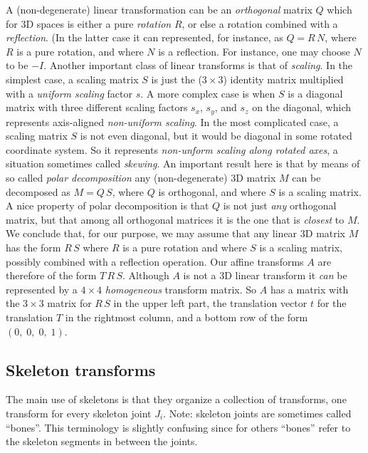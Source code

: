 \noindent
A (non-degenerate) linear transformation can be an \emph{orthogonal} matrix $Q$
which for 3D spaces is either a pure \emph{rotation} $R$, or else a rotation combined with a \emph{reflection}.
(In the latter case it can represented, for instance, as $Q=R\,N$, where $R$ is a pure rotation,
and where $N$ is a reflection. For instance, one may choose $N$ to be $-I$.
Another important class of linear transforms is that of \emph{scaling}.
In the simplest case, a scaling matrix $S$ is just the ($3\times 3$) identity matrix multiplied
with a \emph{uniform scaling} factor $s$. A more complex case is when $S$ is a diagonal matrix
with three different scaling factors $s_x$, $s_y$, and $s_z$ on the diagonal, which represents axis-aligned
\emph{non-uniform scaling}. In the most complicated case, a scaling matrix $S$ is
not even diagonal, but it would be diagonal in some rotated coordinate system.
So it represents \emph{non-unform scaling along rotated axes}, a situation sometimes called \emph{skewing}.
An important result here is that by means of so  called \emph{polar decomposition}
any (non-degenerate) 3D matrix $M$ can be decomposed as $M=Q\, S$,
where $Q$ is orthogonal, and where $S$ is a scaling matrix. A nice property of polar decomposition
is that $Q$ is not just \emph{any} orthogonal matrix, but that among all orthogonal matrices it is the one
that is \emph{closest} to $M$. We conclude that, for our purpose, we may assume that
any linear 3D matrix $M$ has the form $R\,S$ where $R$ is a pure rotation and where $S$ is a scaling matrix,
possibly combined with a reflection operation.
Our affine transforms $A$ are therefore of the form $T\,R\,S$. Although $A$ is not a 3D linear transform
it \emph{can} be represented by a $4\times 4$ \emph{homogeneous} transform matrix.
So $A$ has a matrix with the $3\times 3$ matrix for $R\,S$ in the upper left part, the translation vector
$t$ for the translation $T$ in the rightmost column, and a
 bottom row of the form $(0,\;0,\;0,\; 1)$.



\subsection{Skeleton transforms}
\label{sect:skeletontransforms}

The main use of skeletons is that they organize a collection of transforms, one transform for every skeleton joint $J_i$.
Note: skeleton joints are sometimes called ``bones''. This terminology is slightly confusing since for others ``bones'' refer to
the skeleton segments in between the joints.


